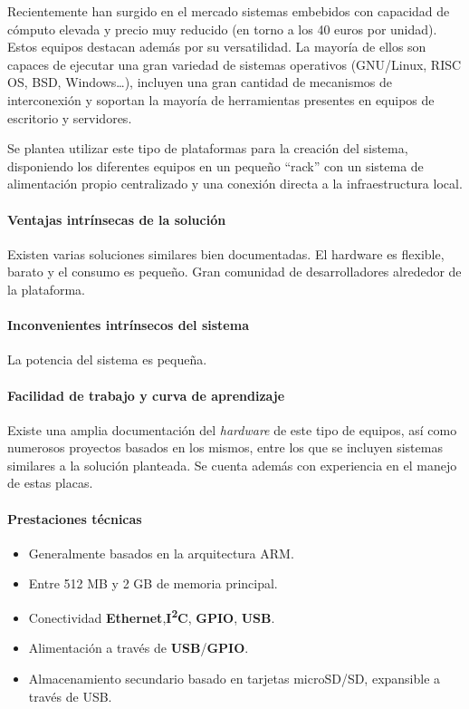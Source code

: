 Recientemente han surgido en el mercado sistemas embebidos con capacidad de cómputo elevada y precio muy reducido (en torno a los 40 euros por unidad). Estos equipos destacan además por su versatilidad. La mayoría de ellos son capaces de ejecutar una gran variedad de sistemas operativos (GNU/Linux, RISC OS, BSD, Windows\dots), incluyen una gran cantidad de mecanismos de interconexión y soportan la mayoría de herramientas presentes en equipos de escritorio y servidores.

Se plantea utilizar este tipo de plataformas para la creación del sistema, disponiendo los diferentes equipos en un pequeño ``rack'' con un sistema de alimentación propio centralizado y una conexión directa a la infraestructura local.

\paragraph{Ventajas intrínsecas de la solución\\}

Existen varias soluciones similares bien documentadas.
El hardware es flexible, barato y el consumo es pequeño.
Gran comunidad de desarrolladores alrededor de la plataforma.

\paragraph{Inconvenientes intrínsecos del sistema\\}

La potencia del sistema es pequeña.

\paragraph{Facilidad de trabajo y curva de aprendizaje\\}

Existe una amplia documentación del \textit{hardware} de este tipo de equipos, así como numerosos proyectos basados en los mismos, entre los que se incluyen sistemas similares a la solución planteada. Se cuenta además con experiencia en el manejo de estas placas.

\paragraph{Prestaciones técnicas}

\begin{itemize}
  \item Generalmente basados en la arquitectura ARM.
  \item Entre 512 MB y 2 GB de memoria principal.
  \item Conectividad \textbf{Ethernet},\textbf{I\textsuperscript{2}C}, \textbf{GPIO}, \textbf{USB}.
  \item Alimentación a través de \textbf{USB}/\textbf{GPIO}.
  \item Almacenamiento secundario basado en tarjetas microSD/SD, expansible a través de USB.
\end{itemize}

